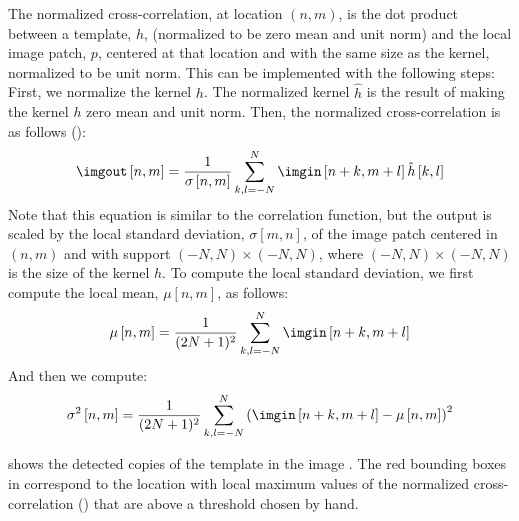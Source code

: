 The normalized cross-correlation, at location $(n,m)$, is the dot product between a template, $h$, (normalized to be zero mean and unit norm) and the local image patch, $p$, centered at that location and with the same size as the kernel, normalized to be unit norm. This can be implemented with the following steps: First, we normalize the kernel $h$. The normalized kernel $\hat h$ is the result of making the kernel $h$ zero mean and unit norm. Then, the normalized cross-correlation is as follows ():
\begin{equation}
	\imgout \left[n,m\right]
	=
	\frac{1}{\sigma \left[n,m \right]}
	\sum_{k,l=-N}^N
	\imgin \left[n+k,m+l \right]
	\hat{h} \left[k,l \right]
\end{equation}
Note that this equation is similar to the correlation function, but the output is scaled by the local standard deviation, $\sigma \left[m,n \right]$, of the image patch centered in $(n,m)$ and with support $(-N,N)\times(-N,N)$, where $(-N,N)\times(-N,N)$ is the size of the kernel $h$. To compute the local standard deviation, we first compute the local mean, $\mu \left[n,m \right]$, as follows:
\begin{equation}
	\mu \left[n,m \right] = \frac{1}{(2N+1)^2} \sum_{k,l=-N}^N \imgin \left[n+k,m+l \right]
\end{equation}
And then we compute:
\begin{equation}
	\sigma^2 \left[n,m \right] = \frac{1}{(2N+1)^2} \sum_{k,l=-N}^N \left( \imgin \left[n+k,m+l \right] - \mu \left[n,m \right] \right) ^2
\end{equation}

 shows the detected copies of the template  in the image . The red bounding boxes in  correspond to the location with local maximum values of the normalized cross-correlation () that are above a threshold chosen by hand.


